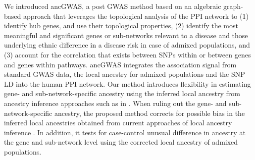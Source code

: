 \documentclass[10pt]{article}
\begin{document}
We introduced ancGWAS, a post GWAS method based on an algebraic graph-based approach that leverages the topological analysis of the PPI network to (1) identify hub genes, and use their topological properties, (2) identify the most meaningful and significant genes or sub-networks relevant to a disease and those underlying ethnic difference in a disease risk in case of admixed populations, and (3) account for the correlation that exists between SNPs within or between genes and genes within pathways. ancGWAS integrates the association signal from standard GWAS data, the local ancestry for admixed populations and the SNP LD into the human PPI network. Our method introduces flexibility in estimating gene- and sub-network-specific ancestry using the inferred local ancestry from ancestry inference approaches such as in \cite{winp,yael,painter,comt,pcadm,chmulti}. When ruling out the gene- and sub-network-specific ancestry, the proposed method corrects for possible bias in the inferred local ancestries obtained from current approaches of local ancestry inference \cite{gala,chims}. In addition, it tests for case-control unusual difference in ancestry at the gene and sub-network level using the corrected local ancestry of admixed populations.
\end{document}
